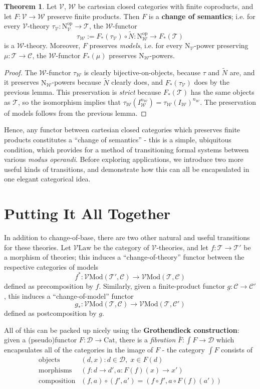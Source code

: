 \documentclass[a4paper,UKenglish]{article}
\theoremstyle{definition}
\newtheorem{theorem}{Theorem}
\newcommand{\Cat}{\mathrm{Cat}}
\newcommand{\Mod}{\mathrm{Mod}}
\newcommand{\op}{\mathrm{op}}
\newcommand{\NN}{\mathrm{N}}
\newcommand{\V}{\mathscr{V}}
\newcommand{\W}{\mathscr{W}}
\newcommand{\D}{\mathscr{D}}
\newcommand{\C}{\mathscr{C}}
\newcommand{\T}{\mathscr{T}}
\begin{document}
\begin{theorem}
	Let $\V$, $\W$ be cartesian closed categories with finite coproducts, and let $F: \V \to \W$ preserve finite products. Then $F$ is a \textbf{change of semantics}; i.e. for every $\V$-theory $\tau_\V: \NN_\V^\op \to \T$, the $\W$-functor $$\tau_\W := F_*(\tau_\V) \circ \tilde{N}: \NN_\W^\op \to F_*(\T)$$ is a $\W$-theory. Moreover, $F$ preserves \textit{models}, i.e. for every $\NN_\V$-power preserving $\mu:\T \to \C$, the $\W$-functor $F_*(\mu)$ preserves $\NN_\W$-powers.
\end{theorem}
\begin{proof}
	The $\W$-functor $\tau_\W$ is clearly bijective-on-objects, because $\tau$ and $\tilde{N}$ are, and it preserves $\NN_\W$-powers because $\tilde{N}$ clearly does, and $F_*(\tau_\V)$ does by the previous lemma. This preservation is \textit{strict} because $F_*(\T)$ has the same objects as $\T$, so the isomorphism implies that $\tau_\W(I_\W^{n_\W}) = \tau_\W(I_\W)^{n_\W}$. The preservation of models follows from the previous lemma.
\end{proof}

Hence, any functor between cartesian closed categories which preserves finite products constitutes a ``change of semantics'' - this is a simple, ubiquitous condition, which provides for a method of transitioning formal systems between various \textit{modus operandi}. Before exploring applications, we introduce two more useful kinds of transitions, and demonstrate how this can all be encapsulated in one elegant categorical idea.

\section{Putting It All Together}

In addition to change-of-base, there are two other natural and useful transitions for these theories. Let $\V\mathrm{Law}$ be the category of $\V$-theories, and let $f:\T\to \T'$ be a morphism of theories; this induces a ``change-of-theory'' functor between the respective categories of models $$f^*:\V\Mod(\T',\C)\to \V\Mod(\T,\C)$$ defined as precomposition by $f$. Similarly, given a finite-product functor $g: \C \to \C'$, this induces a ``change-of-model'' functor $$g_*:\V\Mod(\T,\C) \to \V\Mod(\T,\C')$$ defined as postcomposition by $g$.

All of this can be packed up nicely using the \textbf{Grothendieck construction}: given a (pseudo)functor $F: \D \to \Cat$, there is a \textit{fibration} $\bar{F}: \int F \to \D$ which encapsulates all of the categories in the image of $F$ - the category $\int F$ consists of
\[\begin{array}{rl}
\text{objects} & (d,x) : d\in \D, \; x\in F(d)\\
\text{morphisms} & (f:d\to d',a:F(f)(x)\to x')\\
\text{composition} & (f,a) \circ (f',a') = (f \circ f', a \circ F(f)(a'))\\
\end{array}
\]
\end{document}
